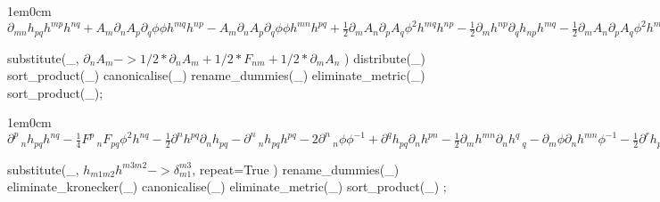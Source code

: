 \documentclass[12pt,a4paper,svgnames]{extarticle}
\begin{document}
\begin{adjustwidth}{1em}{0cm}${}\partial_{m n}{h_{p q}} h^{m p} h^{n q}+A_{m} \partial_{n}{A_{p}} \partial_{q}{\phi} \phi h^{m q} h^{n p}-A_{m} \partial_{n}{A_{p}} \partial_{q}{\phi} \phi h^{m n} h^{p q}+\frac{1}{2}\partial_{m}{A_{n}} \partial_{p}{A_{q}} {\phi}^{2} h^{m q} h^{n p} - \frac{1}{2}\partial_{m}{h^{n p}} \partial_{q}{h_{n p}} h^{m q} - \frac{1}{2}\partial_{m}{A_{n}} \partial_{p}{A_{q}} {\phi}^{2} h^{m p} h^{n q}-\partial_{m n}{h_{p q}} h^{m n} h^{p q}-2\partial_{m n}{\phi} {\phi}^{-1} h^{m n}+\partial_{m}{h_{n p}} \partial_{q}{h^{n q}} h^{m p} - \frac{1}{2}\partial_{m}{h^{m n}} \partial_{n}{h_{p q}} h^{p q}-\partial_{m}{\phi} \partial_{n}{h^{m n}} {\phi}^{-1} - \frac{1}{2}\partial_{m}{h_{n p}} \partial_{q}{h_{r s}} h^{m r} h^{n q} h^{p s}+A_{m} \partial_{n}{A_{p}} \partial_{s}{\phi} \phi h^{m n} h^{p s}+\frac{1}{4}\partial_{m}{h_{n p}} \partial_{q}{h_{r s}} h^{m q} h^{n r} h^{p s}+\frac{1}{2}\partial_{m}{h_{n p}} \partial_{q}{h_{r s}} h^{m n} h^{p q} h^{r s}+\partial_{m}{\phi} \partial_{n}{h_{p q}} {\phi}^{-1} h^{m p} h^{n q}-A_{m} \partial_{n}{A_{p}} \partial_{s}{\phi} \phi h^{m s} h^{n p} - \frac{1}{4}\partial_{m}{h_{n p}} \partial_{q}{h_{r s}} h^{m q} h^{n p} h^{r s}-\partial_{m}{\phi} \partial_{n}{h_{p q}} {\phi}^{-1} h^{m n} h^{p q}$\end{adjustwidth}
\begin{python}
substitute(_, $\partial_{n}{A_{m}} -> 1/2*\partial_{n}{A_{m}} + 1/2*F_{n m} + 1/2*\partial_{m}{A_{n}}$ )
distribute(_)
sort_product(_)
canonicalise(_)
rename_dummies(_)
eliminate_metric(_)
sort_product(_);
\end{python}
\begin{adjustwidth}{1em}{0cm}${}\partial^{p}\,_{n}{h_{p q}} h^{n q} - \frac{1}{4}F^{p}\,_{n} F_{p q} {\phi}^{2} h^{n q} - \frac{1}{2}\partial^{n}{h^{p q}} \partial_{n}{h_{p q}}-\partial^{n}\,_{n}{h_{p q}} h^{p q}-2\partial^{n}\,_{n}{\phi} {\phi}^{-1}+\partial^{q}{h_{p q}} \partial_{n}{h^{p n}} - \frac{1}{2}\partial_{m}{h^{m n}} \partial_{n}{h^{q}\,_{q}}-\partial_{m}{\phi} \partial_{n}{h^{m n}} {\phi}^{-1} - \frac{1}{2}\partial^{r}{h_{p q}} \partial_{n}{h_{r s}} h^{p n} h^{q s}+\frac{1}{4}\partial^{n}{h_{p q}} \partial_{n}{h_{r s}} h^{p r} h^{q s}+\frac{1}{2}\partial^{p}{h_{p q}} \partial_{n}{h_{r s}} h^{q n} h^{r s}+\partial^{p}{\phi} \partial_{n}{h_{p q}} {\phi}^{-1} h^{n q} - \frac{1}{4}\partial^{n}{h_{p q}} \partial_{n}{h_{r s}} h^{p q} h^{r s}-\partial^{n}{\phi} \partial_{n}{h_{p q}} {\phi}^{-1} h^{p q}$\end{adjustwidth}
\begin{python}
substitute(_, $h_{m1 m2} h^{m3 m2} -> \delta_{m1}^{m3}$, repeat=True )
rename_dummies(_)
eliminate_kronecker(_)
canonicalise(_)
eliminate_metric(_)
sort_product(_)
;
\end{python}
\end{document}
